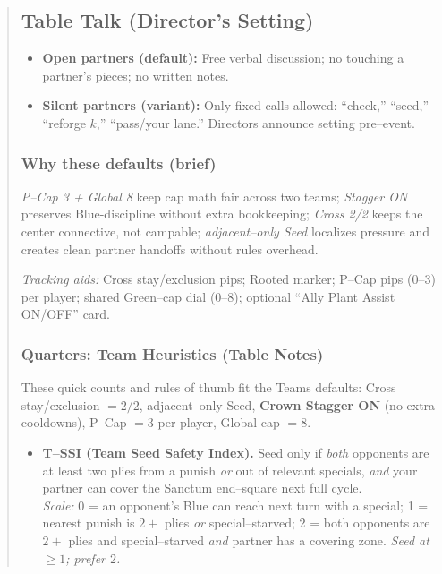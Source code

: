 \documentclass[11pt]{article}
\begin{document}
\begin{quote}
\subsection*{Table Talk (Director’s Setting)}
\begin{itemize}[leftmargin=1.3em,itemsep=0.2em]
  \item \textbf{Open partners (default):} Free verbal discussion; no touching a partner’s pieces; no written notes.
  \item \textbf{Silent partners (variant):} Only fixed calls allowed: “check,” “seed,” “reforge $k$,” “pass/your lane.” Directors announce setting pre–event.
\end{itemize}

\subsubsection*{Why these defaults (brief)}
\noindent \emph{P–Cap 3 + Global 8} keep cap math fair across two teams; \emph{Stagger ON} preserves Blue-discipline without extra bookkeeping; \emph{Cross 2/2} keeps the center connective, not campable; \emph{adjacent–only Seed} localizes pressure and creates clean partner handoffs without rules overhead.

\medskip
\noindent\textit{Tracking aids:} Cross stay/exclusion pips; Rooted marker; P–Cap pips (0–3) per player; shared Green–cap dial (0–8); optional “Ally Plant Assist ON/OFF” card.


\subsubsection*{Quarters: Team Heuristics (Table Notes)}
\label{sec:teams-heuristics}

\noindent These quick counts and rules of thumb fit the Teams defaults: Cross stay/exclusion $=2/2$, adjacent–only Seed, \textbf{Crown Stagger ON} (no extra cooldowns), P–Cap $=3$ per player, Global cap $=8$.

\medskip
\begin{itemize}[leftmargin=1.3em,itemsep=0.3em]

  \item \textbf{T–SSI (Team Seed Safety Index).}
  Seed only if \emph{both} opponents are at least two plies from a punish \emph{or} out of relevant specials, \emph{and} your partner can cover the Sanctum end–square next full cycle.\\
  \emph{Scale:} 0 = an opponent’s Blue can reach next turn with a special; 1 = nearest punish is $2+$ plies \emph{or} special–starved; 2 = both opponents are $2+$ plies and special–starved \emph{and} partner has a covering zone. \emph{Seed at $\ge 1$; prefer $2$.}


\end{itemize}
\end{quote}
\end{document}
